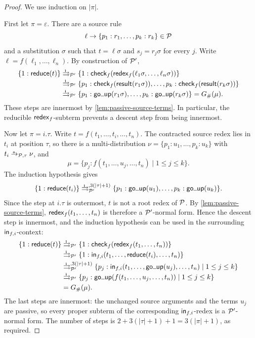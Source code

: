 \begin{proof}
  We use induction on \(|\pi|\).

  First let \(\pi=\varepsilon\).  There are a source rule
  \[
    \ell\to\{p_1:r_1,\ldots,p_k:r_k\}\in\P
  \]
  and a substitution \(\sigma\) such that \(t=\ell\sigma\) and
  \(s_j=r_j\sigma\) for every \(j\).  Write
  \(\ell=f(\ell_1,\ldots,\ell_n)\).  By construction of \(\P'\),
  \[
    \begin{aligned}
      \{1:\treduce(t)\}
      &\iliftto_{\P'}
        \{1:\tcheck_f(\tredex_f(\ell_1\sigma,\ldots,
                                  \ell_n\sigma))\}\\
      &\iliftto_{\P'}
        \{p_1:\tcheck_f(\tresult(r_1\sigma)),\ldots,
          p_k:\tcheck_f(\tresult(r_k\sigma))\}\\
      &\iliftto_{\P'}
        \{p_1:\tgoup(r_1\sigma),\ldots,
          p_k:\tgoup(r_k\sigma)\}
       =G_{\#}(\mu).
    \end{aligned}
  \]
  These steps are innermost by
  \cref{lem:passive-source-terms}.  In particular, the reducible
  \(\tredex_f\)-subterm prevents a descent step from being innermost.

  Now let \(\pi=i.\tau\).  Write
  \(t=f(t_1,\ldots,t_i,\ldots,t_n)\).  The contracted source redex lies in
  \(t_i\) at position \(\tau\), so there is a multi-distribution
  \(\nu=\{p_1:u_1,\ldots,p_k:u_k\}\) with
  \(t_i\oto_{\P,\tau}\nu\), and
  \[
    \mu=\{p_j:f(t_1,\ldots,u_j,\ldots,t_n)\mid 1\leq j\leq k\}.
  \]
  The induction hypothesis gives
  \[
    \{1:\treduce(t_i)\}
      \iliftto_{\P'}^{,3(|\tau|+1)}
      \{p_1:\tgoup(u_1),\ldots,p_k:\tgoup(u_k)\}.
  \]
  Since the step at \(i.\tau\) is outermost, \(t\) is not a root redex of
  \(\P\).  By \cref{lem:passive-source-terms},
  \(\tredex_f(t_1,\ldots,t_n)\) is therefore a \(\P'\)-normal form.  Hence
  the descent step is innermost, and the induction hypothesis can be used in
  the surrounding \(\tin_{f,i}\)-context:
  \[
    \begin{aligned}
      \{1:\treduce(t)\}
      &\iliftto_{\P'}
        \{1:\tcheck_f(\tredex_f(t_1,\ldots,t_n))\}\\
      &\iliftto_{\P'}
        \{1:\tin_{f,i}(t_1,\ldots,\treduce(t_i),\ldots,t_n)\}\\
      &\iliftto_{\P'}^{,3(|\tau|+1)}
        \{p_j:\tin_{f,i}(t_1,\ldots,\tgoup(u_j),\ldots,t_n)
          \mid 1\leq j\leq k\}\\
      &\iliftto_{\P'}
        \{p_j:\tgoup(f(t_1,\ldots,u_j,\ldots,t_n))
          \mid 1\leq j\leq k\}\\
      &=G_{\#}(\mu).
    \end{aligned}
  \]
  The last steps are innermost: the unchanged source arguments and the terms
  \(u_j\) are passive, so every proper subterm of the corresponding
  \(\tin_{f,i}\)-redex is a \(\P'\)-normal form.  The number of steps is
  \(2+3(|\tau|+1)+1=3(|\pi|+1)\), as required.
\end{proof}

